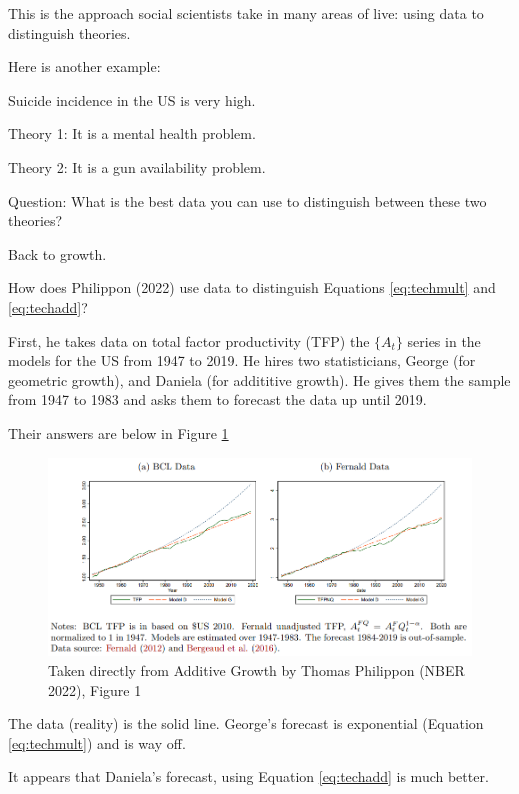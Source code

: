 \documentclass[
]{book}
\begin{document}
This is the approach social scientists take in many areas of live: using data to distinguish theories.

Here is another example:

Suicide incidence in the US is very high.

Theory 1: It is a mental health problem.

Theory 2: It is a gun availability problem.

Question: What is the best data you can use to distinguish between these two theories?

Back to growth.

How does Philippon (2022) use data to distinguish Equations \eqref{eq:techmult} and \eqref{eq:techadd}?

First, he takes data on total factor productivity (TFP) the \(\{A_t\}\) series in the models for the US from 1947 to 2019. He hires two statisticians, George (for geometric growth), and Daniela (for addititive growth). He gives them the sample from 1947 to 1983 and asks them to forecast the data up until 2019.

Their answers are below in Figure \ref{fig:philipponfig1}

\begin{figure}

{\centering \includegraphics[width=1\linewidth]{img/growth2/philipponfig1} 

}

\caption{Taken directly from Additive Growth by Thomas Philippon (NBER 2022), Figure 1}\label{fig:philipponfig1}
\end{figure}

The data (reality) is the solid line. George's forecast is exponential (Equation \eqref{eq:techmult}) and is way off.

It appears that Daniela's forecast, using Equation \eqref{eq:techadd} is much better.
\end{document}
